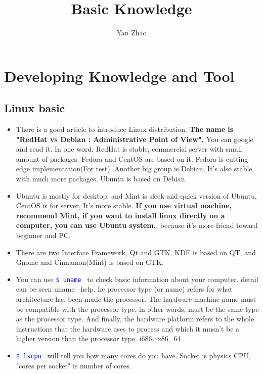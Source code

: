 \documentclass[a4paper,12pt,twoside]{book}
\newcommand{\linuxcommand}[1]{\texttt{\textcolor{blue}{\$ #1 \Pisymbol{psy}{191}}}}
\begin{document}
\title{Basic Knowledge}
\author{Yan Zhao}
\date{}\maketitle

\tableofcontents

\else
\chapter{Developing Knowledge and Tool}
\fi

\section{Linux basic}
\begin{itemize}
		\item There is a good article to introduce Linux distribution. \textbf{The name is "RedHat vs Debian : Administrative Point of View".} You can google and read it. In one word. RedHat is stable, commercial server with small amount of packages. Fedora and CentOS are based on it. Fedora is cutting edge implementation(For test). Another big group is Debian, It's also stable with much more packages. Ubuntu is based on Debian.

		\item Ubuntu is mostly for desktop, and Mint is sleek and quick version of Ubuntu, CentOS is for server, It's more stable. \textbf{If you use virtual machine, recommend Mint, if you want to install linux directly on a computer, you can use Ubuntu system.}, because it's more friend toward beginner and PC. 

		\item There are two Interface Framework, Qt and GTK\@.  KDE is based on QT, and Gnome and Cinnamon(Mint) is based on GTK.  

		\item You can use \linuxcommand{uname} to check basic information about your computer, detail can be seen uname --help. he processor type (or name) refers for what architecture has been made the processor.  The hardware machine name must be compatible with the processor type, in other words, must be the same type as the processor type.  And finally, the hardware platform refers to the whole instructions that the hardware uses to process and which it musn't be a higher version than the processor type. i686=x86\_64

		\item \linuxcommand{lscpu} will tell you how many cores do you have. Socket is physics CPU, "cores per socket" is number of cores. 
\end{itemize}
\end{document}
